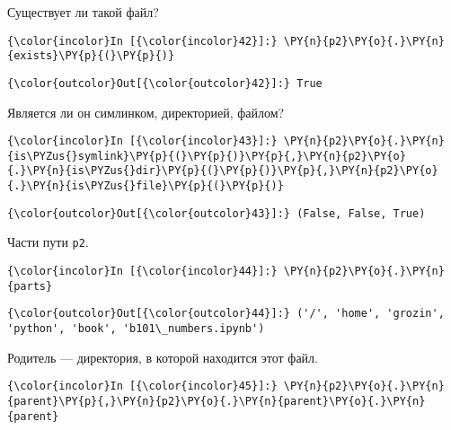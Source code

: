     Существует ли такой файл?

    \begin{Verbatim}[commandchars=\\\{\}]
{\color{incolor}In [{\color{incolor}42}]:} \PY{n}{p2}\PY{o}{.}\PY{n}{exists}\PY{p}{(}\PY{p}{)}
\end{Verbatim}

            \begin{Verbatim}[commandchars=\\\{\}]
{\color{outcolor}Out[{\color{outcolor}42}]:} True
\end{Verbatim}
        
    Является ли он симлинком, директорией, файлом?

    \begin{Verbatim}[commandchars=\\\{\}]
{\color{incolor}In [{\color{incolor}43}]:} \PY{n}{p2}\PY{o}{.}\PY{n}{is\PYZus{}symlink}\PY{p}{(}\PY{p}{)}\PY{p}{,}\PY{n}{p2}\PY{o}{.}\PY{n}{is\PYZus{}dir}\PY{p}{(}\PY{p}{)}\PY{p}{,}\PY{n}{p2}\PY{o}{.}\PY{n}{is\PYZus{}file}\PY{p}{(}\PY{p}{)}
\end{Verbatim}

            \begin{Verbatim}[commandchars=\\\{\}]
{\color{outcolor}Out[{\color{outcolor}43}]:} (False, False, True)
\end{Verbatim}
        
    Части пути \texttt{p2}.

    \begin{Verbatim}[commandchars=\\\{\}]
{\color{incolor}In [{\color{incolor}44}]:} \PY{n}{p2}\PY{o}{.}\PY{n}{parts}
\end{Verbatim}

            \begin{Verbatim}[commandchars=\\\{\}]
{\color{outcolor}Out[{\color{outcolor}44}]:} ('/', 'home', 'grozin', 'python', 'book', 'b101\_numbers.ipynb')
\end{Verbatim}
        
    Родитель --- директория, в которой находится этот файл.

    \begin{Verbatim}[commandchars=\\\{\}]
{\color{incolor}In [{\color{incolor}45}]:} \PY{n}{p2}\PY{o}{.}\PY{n}{parent}\PY{p}{,}\PY{n}{p2}\PY{o}{.}\PY{n}{parent}\PY{o}{.}\PY{n}{parent}
\end{Verbatim}

